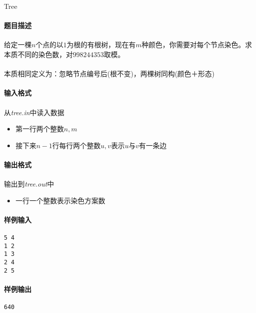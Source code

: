 \documentclass[UTF8]{ctexart}
\begin{document}
\begin{center}
	\large{Tree}
\end{center}
\paragraph{题目描述}
\paragraph{}给定一棵$n$个点的以$1$为根的有根树，现在有$m$种颜色，你需要对每个节点染色。求本质不同的染色数，对$998244353$取模。
\paragraph{}本质相同定义为：忽略节点编号后(根不变)，两棵树同构(颜色＋形态)
\paragraph{输入格式}
\paragraph{}从\emph{tree.in}中读入数据
\begin{itemize}
\item 第一行两个整数$n,m$
\item 接下来$n-1$行每行两个整数$u,v$表示$u$与$v$有一条边
\end{itemize}
\paragraph{输出格式}
\paragraph{}输出到\emph{tree.out}中
\begin{itemize}
	\item 一行一个整数表示染色方案数
\end{itemize}
\paragraph{样例输入}
\begin{lstlisting}
5 4
1 2
1 3
2 4
2 5
\end{lstlisting}
\paragraph{样例输出}
\begin{lstlisting}
640
\end{lstlisting}
\end{document}
